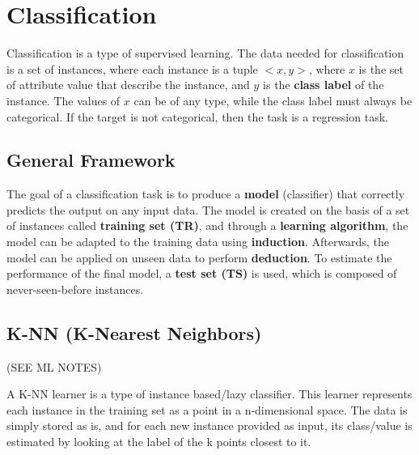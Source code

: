 \chapter{Classification}

Classification is a type of supervised learning. The data needed for classification is a set of instances, where each instance is a tuple $<x,y>$, where $x$ is the set of attribute value that describe the instance, and $y$ is the \textbf{class label} of the instance. The values of $x$ can be of any type, while the class label must always be categorical. If the target is not categorical, then the task is a regression task.

\section{General Framework}

The goal of a classification task is to produce a \textbf{model} (classifier) that correctly predicts the output on any input data. The model is created on the basis of a set of instances called \textbf{training set (TR)}, and through a \textbf{learning algorithm}, the model can be adapted to the training data using \textbf{induction}. Afterwards, the model can be applied on unseen data to perform \textbf{deduction}. To estimate the performance of the final model, a \textbf{test set (TS)} is used, which is composed of never-seen-before instances.

\section{K-NN (K-Nearest Neighbors)}

(SEE ML NOTES)

A K-NN learner is a type of instance based/lazy classifier. This learner represents each instance in the training set as a point in a n-dimensional space. The data is simply stored as is, and for each new instance provided as input, its class/value is estimated by looking at the label of the k points closest to it. 

